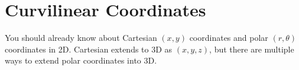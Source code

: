 \chapter{Curvilinear Coordinates}
\noindent
You should already know about Cartesian $(x,y)$ coordinates and polar $(r,\theta)$ coordinates in 2D. Cartesian extends to 3D as $(x,y,z)$, but there are multiple ways to extend polar coordinates into 3D.\\



